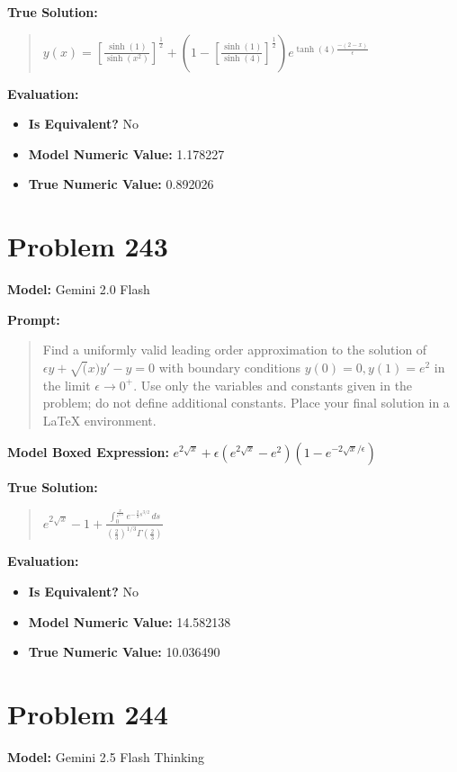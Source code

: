 \documentclass{article}
\begin{document}
{\textbf{True Solution:}
\begin{quote}
$y(x) = [\frac{\sinh(1)}{\sinh(x^2)}]^\frac{1}{2} + (1-[\frac{\sinh(1)}{\sinh(4)}]^\frac{1}{2})e^{\tanh(4)\frac{-(2-x)}{\epsilon}}$
\end{quote}

\textbf{Evaluation:}
\begin{itemize}
\item \textbf{Is Equivalent?} No
\item \textbf{Model Numeric Value:} 1.178227
\item \textbf{True Numeric Value:} 0.892026
\end{itemize}
\vspace{1cm}
\section*{Problem 243}
\textbf{Model:} Gemini 2.0 Flash

\textbf{Prompt:}
\begin{quote}
Find a uniformly valid leading order approximation to the solution of $\epsilon y + \sqrt(x) y' - y = 0$ with boundary conditions $y(0)=0, y(1)=e^2$ in the limit $\epsilon \to 0^+$. Use only the variables and constants given in the problem; do not define additional constants. Place your final solution in a $\boxed{}$ LaTeX environment.
\end{quote}
\textbf{Model Boxed Expression:} $e^{2\sqrt{x}} + \epsilon(e^{2\sqrt{x}}-e^{2})(1-e^{-2\sqrt{x}/\epsilon})$

\textbf{True Solution:}
\begin{quote}
$e^{2\sqrt{x}} - 1 + \frac{\int_0^{\frac{x}{\epsilon^{2/3}}} e^{-\frac{2}{3}s^{3/2}} \, ds}{\left(\frac{2}{3}\right)^{1/3} \Gamma\left(\frac{2}{3}\right)}$
\end{quote}

\textbf{Evaluation:}
\begin{itemize}
\item \textbf{Is Equivalent?} No
\item \textbf{Model Numeric Value:} 14.582138
\item \textbf{True Numeric Value:} 10.036490
\end{itemize}
\vspace{1cm}
\section*{Problem 244}
\textbf{Model:} Gemini 2.5 Flash Thinking

}
\end{document}
